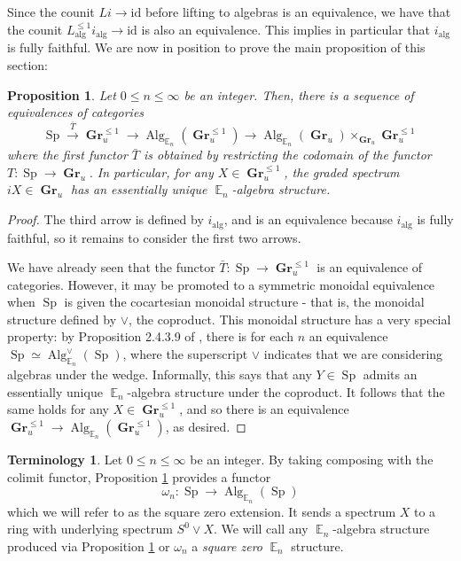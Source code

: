 \documentclass[reqno, oneside]{amsart}
\theoremstyle{definition}
\newtheorem{term}[nul]{Terminology}
\theoremstyle{plain}
\newtheorem{prop}[nul]{Proposition}
\DeclareMathOperator{\E}{\mathbb{E}}
\DeclareMathOperator{\Gr}{\textbf{Gr}}
\DeclareMathOperator{\Alg}{\text{Alg}}
\DeclareMathOperator{\Sp}{\text{Sp}}
\begin{document}
Since the counit $Li \to \text{id}$ before lifting to algebras is an equivalence, we have that the counit $L^{\leq 1}_{\text{alg}}  i_{\text{alg}} \to \text{id}$ is also an equivalence.  This implies in particular that $i_{\text{alg}}$ is fully faithful.  We are now in position to prove the main proposition of this section:

\begin{prop}\label{prop:sq0unique}
Let $0\leq n\leq \infty$ be an integer.  Then, there is a sequence of equivalences of categories $$\Sp \xrightarrow{\bar{T}} \Gr_u^{\leq 1} \longrightarrow \Alg_{\E_n}(\Gr_u^{\leq 1}) \longrightarrow  \Alg_{\E_n}( \Gr_u) \times_{\Gr_u} \Gr^{\leq 1}_u $$ where the first functor $\bar{T}$ is obtained by restricting the codomain of the functor $T:\Sp \to \Gr_u.$  In particular, for any $X\in \Gr_u^{\leq 1}$, the graded spectrum $iX\in \Gr_u$ has an essentially unique $\E_n$-algebra structure.  
\end{prop}
\begin{proof}
The third arrow is defined by $i_{\text{alg}}$, and is an equivalence because $i_{\text{alg}}$ is fully faithful, so it remains to consider the first two arrows.  

We have already seen that the functor $\bar{T}: \Sp \to \Gr^{\leq 1}_u$ is an equivalence of categories.  However, it may be promoted to a symmetric monoidal equivalence when $\Sp$ is given the cocartesian monoidal structure - that is, the monoidal structure defined by $\vee$, the coproduct.  This monoidal structure has a very special property: by Proposition 2.4.3.9 of \cite{HA}, there is for each $n$ an equivalence $\Sp \simeq \Alg^{\vee}_{\E_n}(\Sp)$, where the superscript $\vee$ indicates that we are considering algebras under the wedge.  Informally, this says that any $Y\in \Sp$ admits an essentially unique $\E_n$-algebra structure under the coproduct.  It follows that the same holds for any $X\in \Gr^{\leq 1}_u$, and so there is an equivalence $\Gr^{\leq 1}_u \to \Alg_{\E_n}(\Gr^{\leq 1}_u)$, as desired.    
\end{proof}


\begin{term}
Let $0\leq n\leq \infty$ be an integer.  By taking composing with the colimit functor, Proposition \ref{prop:sq0unique} provides a functor $$\omega_n: \Sp \to \Alg_{\E_n}(\Sp)$$ which we will refer to as the square zero extension.  It sends a spectrum $X$ to a ring with underlying spectrum $S^0\vee X$.  We will call any $\E_n$-algebra structure produced via Proposition \ref{prop:sq0unique} or $\omega_n$ a \emph{square zero} $\E_n$ structure.  
\end{term}
\end{document}
